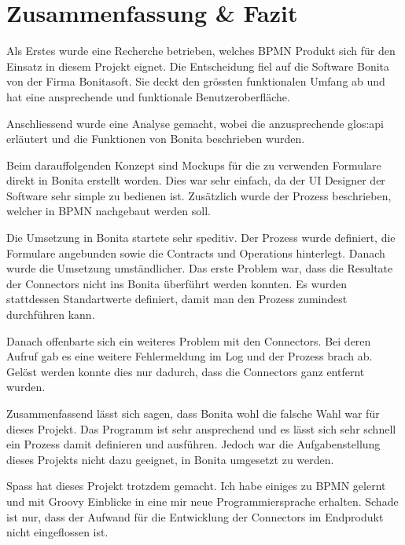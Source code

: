 \chapter{Zusammenfassung \& Fazit}
Als Erstes wurde eine Recherche betrieben, welches BPMN Produkt sich für den Einsatz in diesem Projekt eignet. Die Entscheidung fiel auf die Software Bonita von der Firma Bonitasoft. Sie deckt den grössten funktionalen Umfang ab und hat eine ansprechende und funktionale Benutzeroberfläche. 

Anschliessend wurde eine Analyse gemacht, wobei die anzusprechende \Gls{glos:api} erläutert und die Funktionen von Bonita beschrieben wurden.

Beim darauffolgenden Konzept sind Mockups für die zu verwenden Formulare direkt in Bonita erstellt worden. Dies war sehr einfach, da der UI Designer der Software sehr simple zu bedienen ist. Zusätzlich wurde der Prozess beschrieben, welcher in BPMN nachgebaut werden soll.

Die Umsetzung in Bonita startete sehr speditiv. Der Prozess wurde definiert, die Formulare angebunden sowie die Contracts und Operations hinterlegt. Danach wurde die Umsetzung umständlicher. Das erste Problem war, dass die Resultate der Connectors nicht ins Bonita überführt werden konnten. Es wurden stattdessen Standartwerte definiert, damit man den Prozess zumindest durchführen kann.

Danach offenbarte sich ein weiteres Problem mit den Connectors. Bei deren Aufruf gab es eine weitere Fehlermeldung im Log und der Prozess brach ab. Gelöst werden konnte dies nur dadurch, dass die Connectors ganz entfernt wurden.

Zusammenfassend lässt sich sagen, dass Bonita wohl die falsche Wahl war für dieses Projekt. Das Programm ist sehr ansprechend und es lässt sich sehr schnell ein Prozess damit definieren und ausführen. Jedoch war die Aufgabenstellung dieses Projekts nicht dazu geeignet, in Bonita umgesetzt zu werden.

Spass hat dieses Projekt trotzdem gemacht. Ich habe einiges zu BPMN gelernt und mit Groovy Einblicke in eine mir neue Programmiersprache erhalten. Schade ist nur, dass der Aufwand für die Entwicklung der Connectors im Endprodukt nicht eingeflossen ist.
